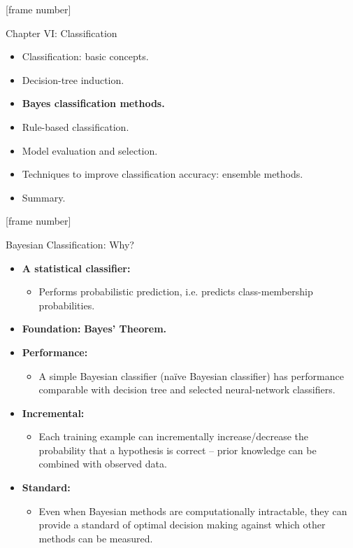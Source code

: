 \documentclass[aspectratio=169,t,table]{beamer}
\begin{document}
  {
    [frame number]
    \begin{frame}{Chapter VI: Classification}
        \begin{itemize}
            \item Classification: basic concepts.
            \item Decision-tree induction.
            \item \textbf{Bayes classification methods.}
            \item Rule-based classification.
            \item Model evaluation and selection.
            \item Techniques to improve classification accuracy: ensemble methods.
            \item Summary.
        \end{itemize}
    \end{frame}
  }

  {
    [frame number]
    \begin{frame}{Bayesian Classification: Why?}
        \begin{itemize}
            \item \textbf{A statistical classifier:}
            \begin{itemize}
              \item Performs probabilistic prediction, i.e. predicts class-membership probabilities.
            \end{itemize}
            \item \textbf{Foundation:} \textbf{\color{airforceblue}Bayes' Theorem.}
            \item \textbf{Performance:}
            \begin{itemize}
              \item A simple Bayesian classifier (naïve Bayesian classifier) has performance comparable with decision tree and selected neural-network classifiers.
            \end{itemize}
            \item \textbf{Incremental:}
            \begin{itemize}
              \item Each training example can incrementally increase/decrease the probability that a hypothesis is correct -- prior knowledge can be combined with observed data.
            \end{itemize}
            \item \textbf{Standard:}
            \begin{itemize}
              \item Even when Bayesian methods are computationally intractable, they can provide a standard of optimal decision making against which other methods can be measured.
            \end{itemize}
        \end{itemize}
    \end{frame}
  }
\end{document}

